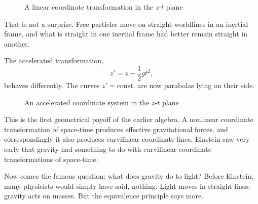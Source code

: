 \begin{figure}[htbp]
\centering
{}
\caption{A linear coordinate transformation in the \(z\)-\(t\) plane}
\end{figure}

That is not a surprise.  Free particles move on straight worldlines in an inertial frame, and what is straight in one inertial frame had better remain straight in another.

The accelerated transformation,
\begin{equation}
z' = z-\frac{1}{2}gt^2,
\end{equation}
behaves differently.  The curves \(z'=\mathrm{const.}\) are now parabolas lying on their side.

\begin{figure}[htbp]
\centering
{}
\caption{An accelerated coordinate system in the \(z\)-\(t\) plane}
\end{figure}

This is the first geometrical payoff of the earlier algebra.  A nonlinear coordinate transformation of space-time produces effective gravitational forces, and correspondingly it also produces curvilinear coordinate lines.  Einstein saw very early that gravity had something to do with curvilinear coordinate transformations of space-time.

Now comes the famous question: what does gravity do to light?  Before Einstein, many physicists would simply have said, nothing.  Light moves in straight lines; gravity acts on masses.  But the equivalence principle says more.

